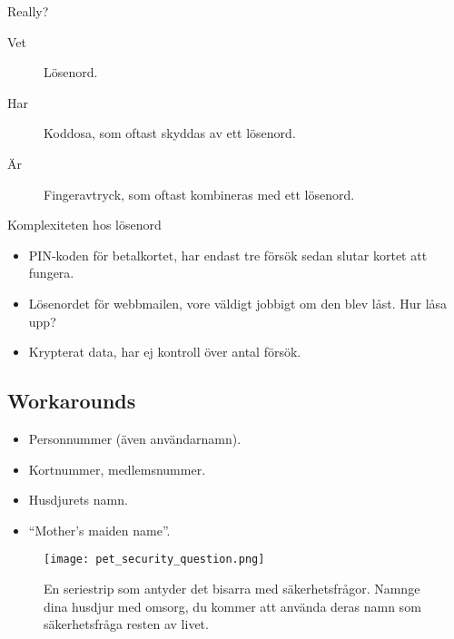 \documentclass{beamer}
\begin{document}
\begin{frame}
  \begin{block}{Really?}
    \begin{description}
      \item[Vet] Lösenord.
      \item[Har] Koddosa, som oftast skyddas av ett lösenord.
      \item[Är] Fingeravtryck, som oftast kombineras med ett lösenord.
    \end{description}
  \end{block}
\end{frame}

\begin{frame}{Komplexiteten hos lösenord}
  \begin{itemize}
    \item PIN-koden för betalkortet, har endast tre försök sedan slutar kortet 
      att fungera.

      \pause{}

    \item Lösenordet för webbmailen, vore väldigt jobbigt om den blev låst.
      Hur låsa upp?

      \pause{}

    \item Krypterat data, har ej kontroll över antal försök.

  \end{itemize}
\end{frame}

\subsection{Workarounds}

\begin{frame}
  \begin{example}
    \begin{itemize}
      \item Personnummer (även användarnamn).
      \item Kortnummer, medlemsnummer.
      \item Husdjurets namn.
      \item \enquote{Mother's maiden name}.
    \end{itemize}
  \end{example}
\end{frame}

\begin{frame}
  \begin{figure}
    \texttt{[image: pet\_security\_question.png]}
    \caption{En seriestrip som antyder det bisarra med säkerhetsfrågor.
    Namnge dina husdjur med omsorg, du kommer att använda deras namn som 
    säkerhetsfråga resten av livet.}
  \end{figure}
\end{frame}
\end{document}
